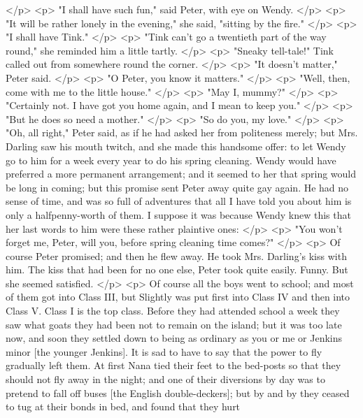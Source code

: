     </p>
    <p>
      "I shall have such fun," said Peter, with eye on Wendy.
    </p>
    <p>
      "It will be rather lonely in the evening," she said, "sitting by the
      fire."
    </p>
    <p>
      "I shall have Tink."
    </p>
    <p>
      "Tink can't go a twentieth part of the way round," she reminded him a
      little tartly.
    </p>
    <p>
      "Sneaky tell-tale!" Tink called out from somewhere round the corner.
    </p>
    <p>
      "It doesn't matter," Peter said.
    </p>
    <p>
      "O Peter, you know it matters."
    </p>
    <p>
      "Well, then, come with me to the little house."
    </p>
    <p>
      "May I, mummy?"
    </p>
    <p>
      "Certainly not. I have got you home again, and I mean to keep you."
    </p>
    <p>
      "But he does so need a mother."
    </p>
    <p>
      "So do you, my love."
    </p>
    <p>
      "Oh, all right," Peter said, as if he had asked her from politeness
      merely; but Mrs. Darling saw his mouth twitch, and she made this handsome
      offer: to let Wendy go to him for a week every year to do his spring
      cleaning. Wendy would have preferred a more permanent arrangement; and it
      seemed to her that spring would be long in coming; but this promise sent
      Peter away quite gay again. He had no sense of time, and was so full of
      adventures that all I have told you about him is only a halfpenny-worth of
      them. I suppose it was because Wendy knew this that her last words to him
      were these rather plaintive ones:
    </p>
    <p>
      "You won't forget me, Peter, will you, before spring cleaning time comes?"
    </p>
    <p>
      Of course Peter promised; and then he flew away. He took Mrs. Darling's
      kiss with him. The kiss that had been for no one else, Peter took quite
      easily. Funny. But she seemed satisfied.
    </p>
    <p>
      Of course all the boys went to school; and most of them got into Class
      III, but Slightly was put first into Class IV and then into Class V. Class
      I is the top class. Before they had attended school a week they saw what
      goats they had been not to remain on the island; but it was too late now,
      and soon they settled down to being as ordinary as you or me or Jenkins
      minor [the younger Jenkins]. It is sad to have to say that the power to
      fly gradually left them. At first Nana tied their feet to the bed-posts so
      that they should not fly away in the night; and one of their diversions by
      day was to pretend to fall off buses [the English double-deckers]; but by
      and by they ceased to tug at their bonds in bed, and found that they hurt
